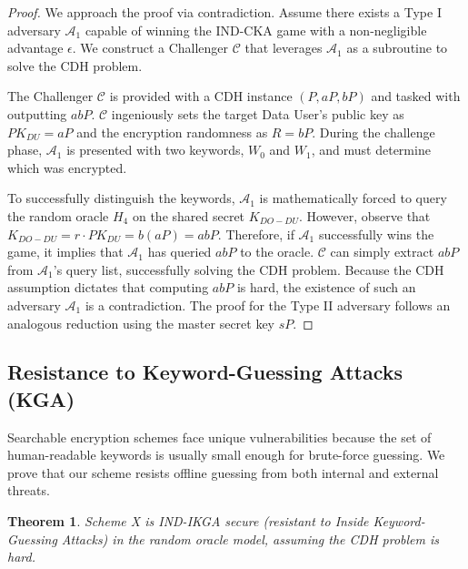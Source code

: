 \documentclass[10pt,journal,compsoc]{IEEEtran}
\newtheorem{theorem}{Theorem}
\begin{document}
\begin{proof}
We approach the proof via contradiction. Assume there exists a Type I adversary $\mathcal{A}_1$ capable of winning the IND-CKA game with a non-negligible advantage $\epsilon$. We construct a Challenger $\mathcal{C}$ that leverages $\mathcal{A}_1$ as a subroutine to solve the CDH problem. 

The Challenger $\mathcal{C}$ is provided with a CDH instance $(P, aP, bP)$ and tasked with outputting $abP$. $\mathcal{C}$ ingeniously sets the target Data User's public key as $PK_{DU} = aP$ and the encryption randomness as $R = bP$. During the challenge phase, $\mathcal{A}_1$ is presented with two keywords, $W_0$ and $W_1$, and must determine which was encrypted. 

To successfully distinguish the keywords, $\mathcal{A}_1$ is mathematically forced to query the random oracle $H_4$ on the shared secret $K_{DO-DU}$. However, observe that $K_{DO-DU} = r \cdot PK_{DU} = b(aP) = abP$. Therefore, if $\mathcal{A}_1$ successfully wins the game, it implies that $\mathcal{A}_1$ has queried $abP$ to the oracle. $\mathcal{C}$ can simply extract $abP$ from $\mathcal{A}_1$'s query list, successfully solving the CDH problem. Because the CDH assumption dictates that computing $abP$ is hard, the existence of such an adversary $\mathcal{A}_1$ is a contradiction. The proof for the Type II adversary follows an analogous reduction using the master secret key $sP$.
\end{proof}

\subsection{Resistance to Keyword-Guessing Attacks (KGA)}
Searchable encryption schemes face unique vulnerabilities because the set of human-readable keywords is usually small enough for brute-force guessing. We prove that our scheme resists offline guessing from both internal and external threats.

\begin{theorem}
Scheme X is IND-IKGA secure (resistant to Inside Keyword-Guessing Attacks) in the random oracle model, assuming the CDH problem is hard.
\end{theorem}
\end{document}
